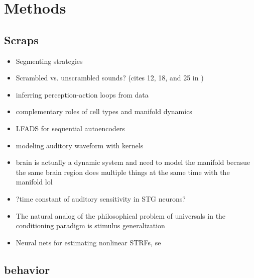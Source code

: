 
% 

\section{Methods}
\begin{multicols}{2}
\subsection{Scraps}


\begin{itemize}
\item Segmenting strategies \cite{ashwoodMiceAlternateDiscrete2020}
\item Scrambled vs. unscrambled sounds? (cites 12, 18, and 25 in \cite{norman-haignereHierarchicalIntegrationMultiple2020})
\item inferring perception-action loops from data \cite{rosasCausalBlanketsTheory2020}
\item complementary roles of cell types and manifold dynamics \cite{dubreuilComplementaryRolesDimensionality2020}
\item LFADS for sequential autoencoders \cite{pandarinathInferringSingletrialNeural2018}
\item modeling auditory waveform with kernels \cite{smithEfficientAuditoryCoding2006a}
\item brain is actually a dynamic system and need to model the manifold \cite{brembsBrainDynamicallyActive2020} becasue the same brain region does multiple things at the same time with the manifold lol \cite{gallegoCorticalPopulationActivity2018}
\item ?time constant of auditory sensitivity in STG neurons?
\item The natural analog of the philosophical problem of universals in the conditioning paradigm is stimulus generalization \cite{roschWittgensteinCategorizationResearch1987}	
\item Neural nets for estimating nonlinear STRFs, se \cite{kingRecentAdvancesUnderstanding2018a}
\end{itemize}

\subsection{behavior}



\end{multicols}
